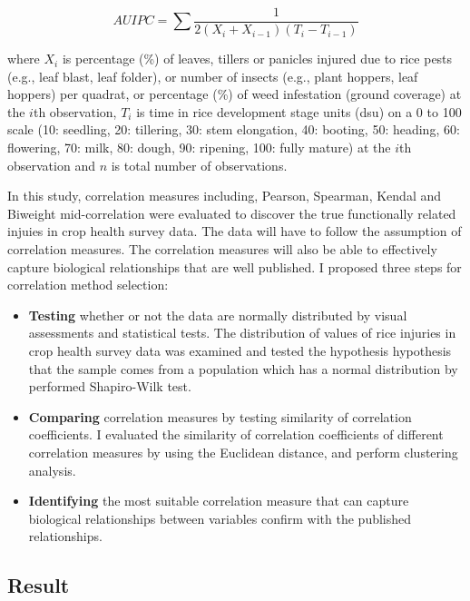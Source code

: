 \begin{equation}
AUIPC = \sum{\frac{1}{2(X_{i} + X_{i-1})(T_{i} - T_{i-1})}}
\end{equation}

where $X_i$ is percentage (\%) of leaves, tillers or panicles injured due to rice pests (e.g., leaf blast, leaf folder), or number of insects (e.g., plant hoppers, leaf hoppers) per quadrat, or percentage (\%) of weed infestation (ground coverage) at the $i$th observation, $T_i$ is time in rice development stage units (dsu) on a 0 to 100 scale (10: seedling, 20: tillering, 30: stem elongation, 40: booting, 50: heading, 60: flowering, 70: milk, 80: dough, 90: ripening, 100: fully mature) at the $i$th observation and $n$ is total number of observations.

In this study, correlation measures including, Pearson, Spearman, Kendal and Biweight mid-correlation \citep{Wilcox_2012_Introduction} were evaluated to discover the true functionally related injuies in crop health survey data. The data will have to follow the assumption of correlation measures. The correlation measures will also be able to effectively capture biological relationships that are well published. I proposed three steps for correlation method selection: 

\begin{itemize}
\item \textbf{Testing} whether or not the data are normally distributed by visual assessments and statistical tests. The distribution of values of rice injuries in crop health survey data was examined and tested the hypothesis hypothesis that the sample comes from a population which has a normal distribution by performed Shapiro-Wilk test.

\item \textbf{Comparing} correlation measures by testing similarity of correlation coefficients. I evaluated the similarity of correlation coefficients of different correlation measures by using the Euclidean distance, and perform clustering analysis.
\item \textbf{Identifying} the most suitable correlation measure that can capture biological relationships between variables confirm with the published relationships.
\end{itemize}

\newpage
\subsection{Result}

